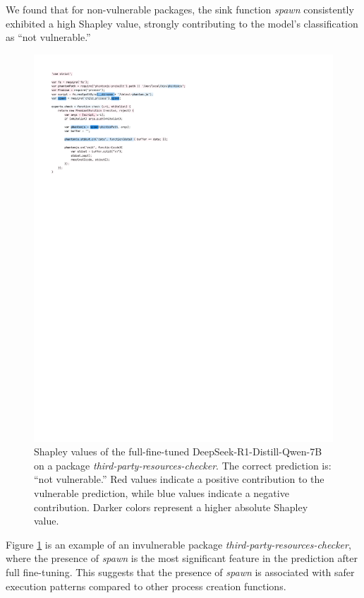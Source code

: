 \documentclass[12pt,openany,oneside,table]{cmuthesis}
\begin{document}
We found that for non-vulnerable packages, the sink function \textit{spawn} consistently exhibited a high Shapley value, strongly contributing to the model’s classification as “not vulnerable.” 
%
\begin{figure}[t!]
  \centering
  \includegraphics[width=\linewidth]{figures/formatted_code.pdf}
  \vspace{-10pt}
  \caption{Shapley values of the full-fine-tuned DeepSeek-R1-Distill-Qwen-7B on a
  package \textit{third-party-resources-checker}. The correct prediction is: ``not vulnerable.'' Red values indicate a positive contribution to the vulnerable prediction, while blue values indicate a negative contribution. Darker colors represent a higher absolute Shapley value. 
  }
  \label{fig:shapley_spawn}
\end{figure}

Figure \ref{fig:shapley_spawn} is an example of an invulnerable package \textit{third-party-resources-checker}, where the presence of \textit{spawn} is the most significant feature in the prediction after full fine-tuning.
This suggests that the presence of \textit{spawn} is associated with safer execution patterns compared to other process creation functions.
\end{document}
